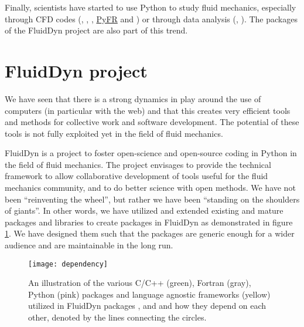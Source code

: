 Finally, scientists have started to use Python to study fluid mechanics,
especially through CFD codes (,
,
, \href{http://pyfr.org/}{PyFR}
and ) or through data analysis
(,
).
%
The packages of the FluidDyn project are also part of this trend.

\section{FluidDyn project}
We have seen that there is a strong dynamics in play around the use of
computers (in particular with the web) and that this creates very efficient
tools and methods for collective work and software development.
%
The potential of these tools is not fully exploited yet in the field of fluid
mechanics.

FluidDyn is a project to foster open-science and open-source coding in Python
in the field of fluid mechanics.
%
The project envisages to provide the technical framework to allow collaborative
development of tools useful for the fluid mechanics community, and to do better
science with open methods.
%
We have not been ``reinventing the wheel'', but rather we have been ``standing
on the shoulders of giants''. In other words, we have utilized and extended
existing and mature packages and libraries to create packages in FluidDyn as
demonstrated in figure \ref{fig:dependency}. We have designed them such that
the packages are generic enough for a wider audience and are maintainable in
the long run.

\begin{figure}[h]
  \centering
  \texttt{[image: dependency]}
  \caption{An illustration of the various C/C++ (green), Fortran (gray), Python
  (pink) packages and language agnostic frameworks (yellow) utilized in
  FluidDyn packages ,  and  and
  how they depend on each other, denoted by the lines connecting the
  circles.}\label{fig:dependency}
\end{figure}

